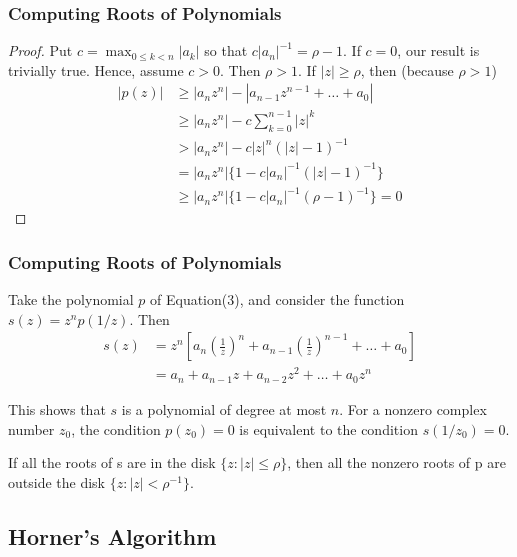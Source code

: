 \documentclass[notheorems,mathserif,table,compress]{beamer}  %
\begin{document}
\begin{frame}
\frametitle{Computing Roots of Polynomials}
\begin{proof}
Put $c=\max_{0\leq k<n}|a_k|$ so that $c|a_n|^{-1}=\rho-1$. If $c=0$, our result is trivially true. Hence, assume $c>0$. Then $\rho>1$. If $|z|\geq \rho$, then (because $\rho>1$)
\begin{equation*}
\begin{split}
|p(z)| & \geq |a_n z^n|-|a_{n-1} z^{n-1}+\ldots+a_0| \\
       & \geq|a_n z^n|-c\sum_{k=0}^{n-1}|z|^k\\
       & >|a_n z^n|-c|z|^n(|z|-1)^{-1}\\
       & =|a_n z^n|\{1-c|a_n|^{-1}(|z|-1)^{-1}\}\\
       & \geq|a_n z^n|\{1-c|a_n|^{-1}(\rho-1)^{-1}\}=0
\end{split}
\end{equation*}

\end{proof}
\end{frame}

\begin{frame}
\frametitle{Computing Roots of Polynomials}
Take the polynomial $p$ of Equation(3), and consider the function $s(z)=z^n p(1/z)$. Then
\begin{equation*}
\begin{split}
s(z) & =z^n[a_n\left(\frac{1}{z}\right)^n+a_{n-1}\left(\frac{1}{z}\right)^{n-1}+\ldots+a_0]\\
     & =a_n+a_{n-1}z+a_{n-2}z^2+\ldots+a_0 z^n
\end{split}
\end{equation*}

This shows that $s$ is a polynomial of degree at most $n$. For a nonzero complex number $z_0$, the condition $p(z_0)=0$ is equivalent to the condition $s(1/z_0)=0$.
\begin{theorem}
If all the roots of s are in the disk $\{z:|z|\leq \rho\}$, then all the nonzero roots of p are outside the disk $\{z:|z|<\rho^{-1}\}$.
\end{theorem}
\end{frame}

\subsection{Horner's Algorithm}
\end{document}
